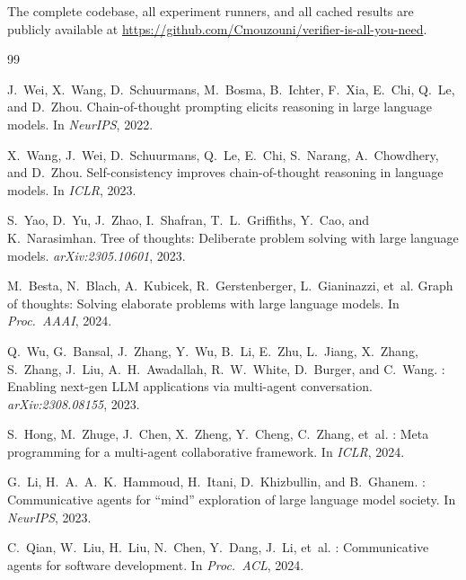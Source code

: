 \documentclass[11pt]{amsart}
\newcommand\1{{\mathds{1}}}
\theoremstyle{definition}
\theoremstyle{remark}
\numberwithin{equation}{section}
\begin{document}
The complete codebase, all experiment runners, and all cached results are publicly available at \url{https://github.com/Cmouzouni/verifier-is-all-you-need}.

\begin{thebibliography}{99}

J.~Wei, X.~Wang, D.~Schuurmans, M.~Bosma, B.~Ichter, F.~Xia, E.~Chi, Q.~Le, and D.~Zhou.
\newblock Chain-of-thought prompting elicits reasoning in large language models.
\newblock In \emph{NeurIPS}, 2022.

X.~Wang, J.~Wei, D.~Schuurmans, Q.~Le, E.~Chi, S.~Narang, A.~Chowdhery, and D.~Zhou.
\newblock Self-consistency improves chain-of-thought reasoning in language models.
\newblock In \emph{ICLR}, 2023.

S.~Yao, D.~Yu, J.~Zhao, I.~Shafran, T.~L.~Griffiths, Y.~Cao, and K.~Narasimhan.
\newblock Tree of thoughts: Deliberate problem solving with large language models.
\newblock \emph{arXiv:2305.10601}, 2023.

M.~Besta, N.~Blach, A.~Kubicek, R.~Gerstenberger, L.~Gianinazzi, et~al.
\newblock Graph of thoughts: Solving elaborate problems with large language models.
\newblock In \emph{Proc.\ AAAI}, 2024.

Q.~Wu, G.~Bansal, J.~Zhang, Y.~Wu, B.~Li, E.~Zhu, L.~Jiang, X.~Zhang, S.~Zhang, J.~Liu, A.~H.~Awadallah, R.~W.~White, D.~Burger, and C.~Wang.
: Enabling next-gen {LLM} applications via multi-agent conversation.
\newblock \emph{arXiv:2308.08155}, 2023.

S.~Hong, M.~Zhuge, J.~Chen, X.~Zheng, Y.~Cheng, C.~Zhang, et~al.
: Meta programming for a multi-agent collaborative framework.
\newblock In \emph{ICLR}, 2024.

G.~Li, H.~A.~A.~K.~Hammoud, H.~Itani, D.~Khizbullin, and B.~Ghanem.
: Communicative agents for ``mind'' exploration of large language model society.
\newblock In \emph{NeurIPS}, 2023.

C.~Qian, W.~Liu, H.~Liu, N.~Chen, Y.~Dang, J.~Li, et~al.
: Communicative agents for software development.
\newblock In \emph{Proc.\ ACL}, 2024.


\end{thebibliography}
\end{document}
